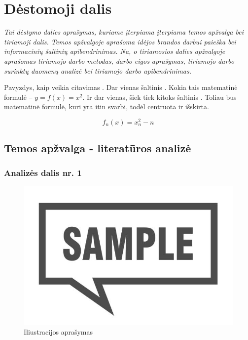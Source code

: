 \newpage
\section{Dėstomoji dalis}
\textit{Tai dėstymo dalies aprašymas, kuriame įterpiama įterpiama temos apžvalga bei tiriamoji dalis. Temos apžvalgoje aprašoma idėjos brandos darbui paieška bei informacinių šaltinių apibendrinimas. Na, o tiriamosios dalies apžvalgoje aprašomas tiriamojo darbo metodas, darbo eigos aprašymas, tiriamojo darbo surinktų duomenų analizė bei tiriamojo darbo apibendrinimas.}

Pavyzdys, kaip veikia citavimas \cite{brandos_2019}. Dar vienas šaltinis \cite{eberson_nacionaline_nodate}. Kokia tais matematinė formulė – $y=f(x)=x^2$. Ir dar vienas, šiek tiek kitoks šaltinis \cite{tupinis_inovacijos_2022}. Toliau bus matematinė formulė, kuri yra itin svarbi, todėl centruota ir išskirta.

$$f_{n}(x)=x_{n}^{2}-n$$

\subsection{Temos apžvalga - literatūros analizė}
\subsubsection{Analizės dalis nr. 1}
\lipsum[4]
\begin{figure}[H]
    \centering
    \includegraphics{media/sample-img}
    \caption{Iliustracijos aprašymas}
    \label{fig:laikina_iliustracija}
\end{figure}
